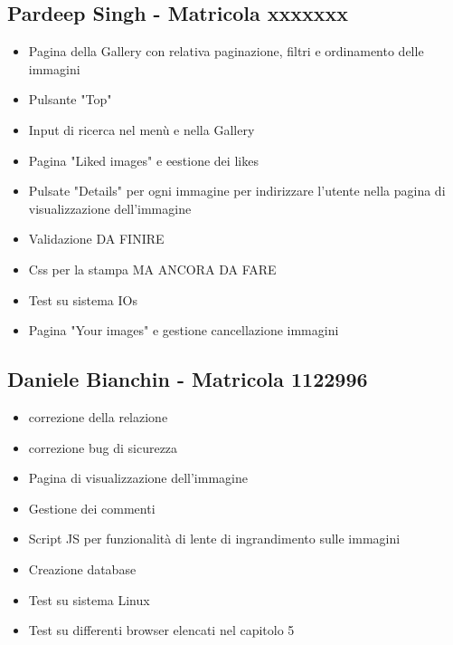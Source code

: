 \documentclass[openany, a4paper, 12pt]{report}
\begin{document}
	\subsection{Pardeep Singh - Matricola xxxxxxx}
	\begin{itemize}
		\item Pagina della Gallery con relativa paginazione, filtri e ordinamento delle immagini
		\item Pulsante "Top"
		\item Input di ricerca nel menù e nella Gallery
		\item Pagina "Liked images" e eestione dei likes
		\item Pulsate "Details" per ogni immagine per indirizzare l'utente nella pagina di visualizzazione dell'immagine 
		\item Validazione DA FINIRE
		\item Css per la stampa MA ANCORA DA FARE
		\item Test su sistema IOs
		\item Pagina "Your images" e gestione cancellazione immagini
	\end{itemize}
	\subsection{Daniele Bianchin - Matricola 1122996}
	\begin{itemize}
		\item correzione della relazione
		\item correzione bug di sicurezza
		\item Pagina di visualizzazione dell'immagine
		\item Gestione dei commenti
		\item Script JS per funzionalità di lente di ingrandimento sulle immagini
		\item Creazione database
		\item Test su sistema Linux
		\item Test su differenti browser elencati nel capitolo 5
	\end{itemize}
\end{document}
